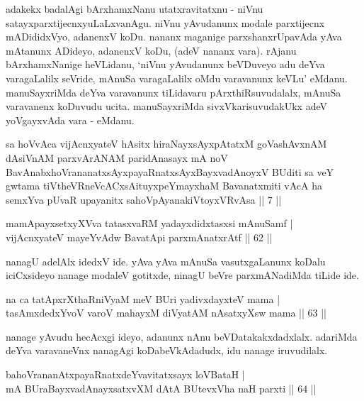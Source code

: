 \begin{artha}
adakekx badalAgi bArxhamxNanu utatxravitatxnu - niVnu 
satayxparxtijecnxyuLaLxvanAgu. niVnu yAvudanunx modale parxtijecnx 
mADididxVyo, adanenxV koDu. nananx maganige parxshanxrUpavAda yAva 
mAtanunx ADideyo, adanenxV koDu, (adeV nananx vara). rAjanu 
bArxhamxNanige heVLidanu, `niVnu yAvudanunx beVDuveyo adu deYva 
varagaLalilx seVride, mAnuSa varagaLalilx oMdu varavanunx keVLu' 
eMdanu. manuSayxriMda deYva varavanunx tiLidavaru pArxthiRsuvudalalx, 
mAnuSa varavanenx koDuvudu ucita. manuSayxriMda sivxVkarisuvudakUkx 
adeV yoVgayxvAda vara - eMdanu.
\end{artha}

\begin{kandikeshl}
sa hoVvAca vijAcnxyateV hAsitx hiraNayxsAyxpAtatxM goVashAvxnAM dAsiVnAM parxvArANAM paridAnasayx mA noV BavAnabxhoVrananatxsAyxpayaRnatxsAyxBayxvadAnoyxV BUditi sa veY gwtama tiVtheVRneVcACxsA\break ituyxpeYmayxhaM Bavanatxmiti vAcA ha semxYva pUvaR upayanitx sa\break hoVpAyanakiVtoyxVRvAsa || 7 ||
\end{kandikeshl}

\begin{shl}
mamApayxsetxyXVva tatasxvaRM yadayxdidxtasxsi mAnuSamf | \\
vijAcnxyateV mayeYvA\s \s dw BavatA\s pi parxmAnatxrAtf \hfill|| 62 || 
\end{shl}

\begin{artha}
nanagU adelAlx idedxV ide. yAva yAva mAnuSa vasutxgaLanunx 
koDalu iciCxsideyo nanage modaleV gotitxde, ninagU beVre parxmANadiMda 
tiLide ide.
\end{artha}

\begin{shl}
na ca tatApxrXthaRniVyaM meV BUri yadivxdayxteV mama | \\
tasAmxdedxYvoV varoV mahayxM diVyatAM nAsatxyXsw mama \hfill|| 63 || 
\end{shl}

\begin{artha}
nanage yAvudu hecAcxgi ideyo, adanunx nAnu beVDatakakxdadxlalx. adariMda deYva varavaneVnx nanagAgi koDabeVkAdadudx, idu nanage iruvudilalx.
\end{artha}


\begin{shl}
bahoVrananAtxpayaRnatxdeYvavitatxsayx loVBataH | \\
mA BUraBayxvadAnayxsatxvXM dAtA BUtevxVha naH parxti \hfill|| 64 || 
\end{shl}

